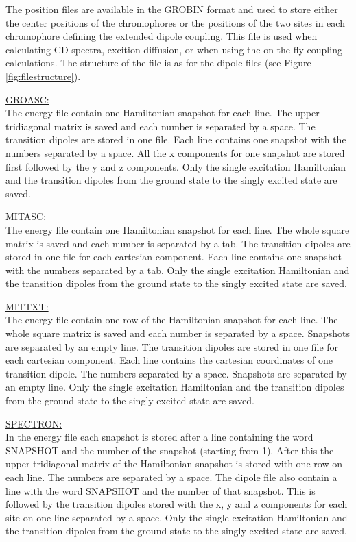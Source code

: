 The position files are available in the GROBIN format and used to store either the center positions of the chromophores or the positions of the two sites in each chromophore defining the extended dipole coupling. This file is used when calculating CD spectra, excition diffusion, or when using the on-the-fly coupling calculations. The structure of the file is as for the dipole files (see Figure \ref{fig:filestructure}).

\noindent
\underline{GROASC:}\\
The energy file contain one Hamiltonian snapshot for each line. The upper tridiagonal matrix is saved and each number is separated by a space. The transition dipoles are stored in one file. Each line contains one snapshot with the numbers separated by a space. All the x components for one snapshot are stored first followed by the y and z components. Only the single excitation Hamiltonian and the transition dipoles from the ground state to the singly excited state are saved.

\noindent
\underline{MITASC:}\\
The energy file contain one Hamiltonian snapshot for each line. The whole square matrix is saved and each number is separated by a tab. The transition dipoles are stored in one file for each cartesian component. Each line contains one snapshot with the numbers separated by a tab. Only the single excitation Hamiltonian and the transition dipoles from the ground state to the singly excited state are saved.

\noindent
\underline{MITTXT:}\\
The energy file contain one row of the Hamiltonian snapshot for each line. The whole square matrix is saved and each number is separated by a space. Snapshots are separated by an empty line. The transition dipoles are stored in one file for each cartesian component. Each line contains the cartesian coordinates of one transition dipole. The numbers separated by a space. Snapshots are separated by an empty line. Only the single excitation Hamiltonian and the transition dipoles from the ground state to the singly excited state are saved.

\noindent
\underline{SPECTRON:}\\
In the energy file each snapshot is stored after a line containing the word SNAPSHOT and the number
of the snapshot (starting from 1). After this the upper tridiagonal matrix of the Hamiltonian snapshot is stored with one row on each line. The numbers are separated by a space. The dipole file also contain a line with the word SNAPSHOT and the number of that snapshot. This is followed by the transition dipoles stored with the x, y and z components for each site on one line separated by a space. Only the single excitation Hamiltonian and the transition dipoles from the ground state to the singly excited state are saved.


